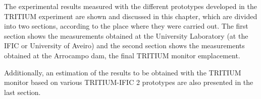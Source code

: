 The experimental results measured with the different prototypes developed in the TRITIUM experiment are shown and discussed in this chapter, which are divided into two sections, according to the place where they were carried out. The first section shows the measurements obtained at the University Laboratory (at the IFIC or University of Aveiro) and the second section shows the measurements obtained at the Arrocampo dam, the final TRITIUM monitor emplacement.

Additionally, an estimation of the results to be obtained with the TRITIUM monitor based on various TRITIUM-IFIC 2 prototypes are also presented in the last section. 


